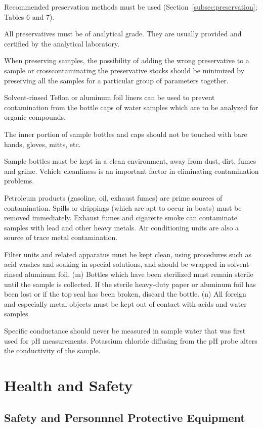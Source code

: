 \documentclass[12pt]{../SOP4_alpha}\usepackage[]{graphicx}\usepackage[]{xcolor}
\begin{document}
\NP Recommended preservation methods must be used (Section~\ref{subsec:preservation}; Tables 6 and 7). 

\NP All preservatives must be of analytical grade. They are usually provided and certified by the analytical laboratory. 

\NP When preserving samples, the possibility of adding the wrong preservative to a sample or crosscontaminating the preservative stocks should be minimized by preserving all the samples for a particular group of parameters together. 

\NP Solvent-rinsed Teflon or aluminum foil liners can be used to prevent contamination from the bottle caps of water samples which are to be analyzed for organic compounds.

\NP The inner portion of sample bottles and caps should not be touched with bare hands, gloves, mitts, etc. 

\NP Sample bottles must be kept in a clean environment, away from dust, dirt, fumes and grime. Vehicle cleanliness is an important factor in eliminating contamination problems. 

\NP  Petroleum products (gasoline, oil, exhaust fumes) are prime sources of contamination. Spills or drippings (which are apt to occur in boats) must be removed immediately. Exhaust fumes and cigarette smoke can contaminate samples with lead and other heavy metals. Air conditioning units are also a source of trace metal contamination. 

\NP Filter units and related apparatus must be kept clean, using procedures such as acid washes and soaking in special solutions, and should be wrapped in solvent-rinsed aluminum foil. (m) Bottles which have been sterilized must remain sterile until the sample is collected. If the sterile heavy-duty paper or aluminum foil has been lost or if the top seal has been broken, discard the bottle. (n) All foreign and especially metal objects must be kept out of contact with acids and water samples. 

\NP Specific conductance should never be measured in sample water that was first used for pH measurements. Potassium chloride diffusing from the pH probe alters the conductivity of the sample.


\section{Health and Safety}

\subsection{Safety and Personnnel Protective Equipment}
\end{document}
